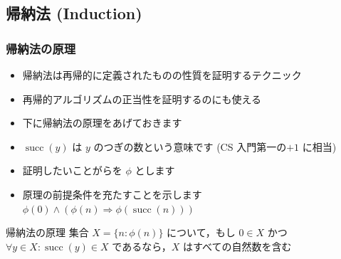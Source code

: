 \subsection{帰納法 (Induction)}
\begin{frame}[fragile]
\frametitle{帰納法の原理}
  \begin{itemize}
\item 帰納法は再帰的に定義されたものの性質を証明するテクニック
\item 再帰的アルゴリズムの正当性を証明するのにも使える
\item 下に帰納法の原理をあげておきます
\item \(\operatorname{succ}(y)\) は $y$ のつぎの数という意味です (CS 入門第一の\(+1\) に相当)
\item 証明したいことがらを \(\phi\) とします
\item 原理の前提条件を充たすことを示します \(\phi(0)\wedge(\phi(n)\Rightarrow\phi(\operatorname{succ}(n)))\)
  \end{itemize}
  \begin{block}{帰納法の原理}
集合 \(X=\{n\colon \phi(n)\}\) について，もし \(0\in X\) かつ \(\forall y\in X\colon \operatorname{succ}(y)\in X\) であるなら，$X$ はすべての自然数を含む
  \end{block}
\end{frame}
